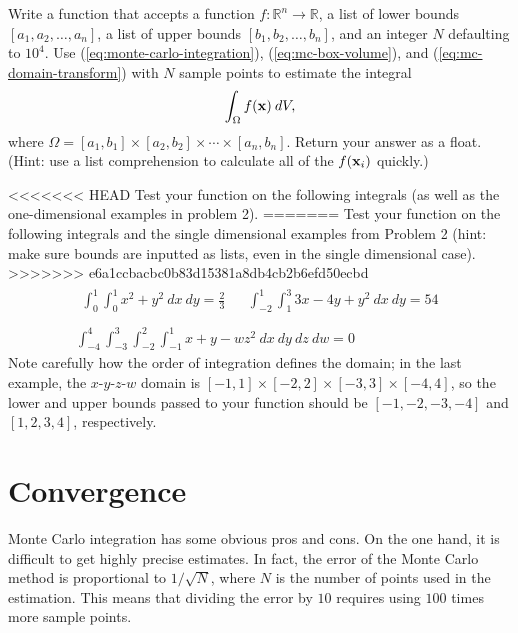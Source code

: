 \begin{problem}
Write a function that accepts a function $f:\mathbb{R}^n\rightarrow\mathbb{R}$, a list of lower bounds $[a_1, a_2, \ldots, a_n]$, a list of upper bounds $[b_1, b_2, \ldots, b_n]$, and an integer $N$ defaulting to $10^4$.
Use (\ref{eq:monte-carlo-integration}), (\ref{eq:mc-box-volume}), and (\ref{eq:mc-domain-transform}) with $N$ sample points to estimate the integral
\[
\int_\Omega f(\mathbf{x})\:dV,
\]
where $\Omega = [a_1,b_1]\times[a_2,b_2]\times\cdots\times[a_n,b_n]$. Return your answer as a float.
\\(Hint: use a list comprehension to calculate all of the $f(\mathbf{x}_i)$ quickly.)

<<<<<<< HEAD
Test your function on the following integrals (as well as the one-dimensional examples in problem 2).
=======
Test your function on the following integrals and the single dimensional examples from Problem 2 (hint: make sure bounds are inputted as lists, even in the single dimensional case).
>>>>>>> e6a1ccbacbc0b83d15381a8db4cb2b6efd50ecbd
\[
\begin{array}{c}
    \begin{array}{ccc}
    \displaystyle\int_0^1\int_0^1 x^2 + y^2\:dx\:dy = \frac{2}{3}
    & &
    \displaystyle\int_{-2}^1\int_1^3 3x - 4y + y^2\:dx\:dy = 54
    \end{array}
\\ \\
\displaystyle\int_{-4}^4\int_{-3}^3\int_{-2}^2\int_{-1}^1 x + y - w z^2\:dx\:dy\:dz\:dw = 0
\end{array}
\]
Note carefully how the order of integration defines the domain; in the last example, the $x$-$y$-$z$-$w$ domain is $[-1,1]\times[-2,2]\times[-3,3]\times[-4,4]$, so the lower and upper bounds passed to your function should be $[-1, -2, -3, -4]$ and $[1, 2, 3, 4]$, respectively.
\label{prob:montecarlo-integration-nd}
\end{problem}

\section*{Convergence} %

Monte Carlo integration has some obvious pros and cons.
On the one hand, it is difficult to get highly precise estimates.
In fact, the error of the Monte Carlo method is proportional to $1/\sqrt{N}$, where $N$ is the number of points used in the estimation.
This means that dividing the error by $10$ requires using $100$ times more sample points.

